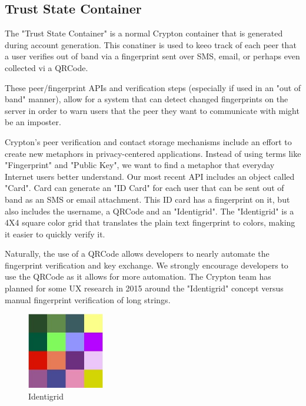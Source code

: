 \documentclass[conference]{IEEEtran}
\begin{document}
\subsection{Trust State Container}
The "Trust State Container" is a normal Crypton container that is generated during account generation. This conatiner is used to keeo track of each peer that a user verifies out of band via a fingerprint sent over SMS, email, or perhaps even collected vi a QRCode\cite{QRCode}.

These peer/fingerprint APIs and verification steps (especially if used in an "out of band" manner), allow for a system that can detect changed fingerprints on the server in order to warn users that the peer they want to communicate with might be an imposter.

Crypton's peer verification and contact storage mechanisms include an effort to create new metaphors in privacy-centered applications. Instead of using terms like "Fingerprint" and "Public Key", we want to find a metaphor that everyday Internet users better understand. Our most recent API includes an object called "Card". Card can generate an "ID Card" for each user that can be sent out of band as an SMS or email attachment. This ID card has a fingerprint on it, but also includes the username, a QRCode and an "Identigrid". The "Identigrid" is a 4X4 square color grid that translates the plain text fingerprint to colors, making it easier to quickly verify it.

Naturally, the use of a QRCode\cite{QRCode} allows developers to nearly automate the fingerprint verification and key exchange. We strongly encourage developers to use the QRCode as it allows for more automation. The Crypton team has planned for some UX research in 2015 around the "Identigrid" concept versus manual fingerprint verification of long strings.

\begin{figure}[h]
  \centering
  \includegraphics[width=0.3\textwidth]{identigrid-example.jpg}
  \caption{Identigrid}
\end{figure}
\end{document}
